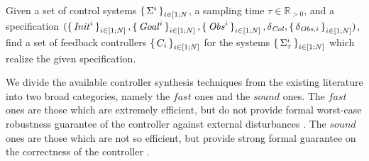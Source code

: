 \begin{comment}
 \item for \emph{every} $k\leq K$ and every $1\leq i\le N$ we have $D(x^i_k,obs)>\delta_{\obs}$.
 
 \end{itemize}
 For a given control system $\Sigma$, the targetted problem is denoted by a tuple $(x_0, \reach,\obs, \delta_{\obs},\delta_{\col})$. In linear temporal logic (LTL) notation \cite{baier2008principles}, the above conditions can be succinctly written as:
\begin{equation}\label{eq:spec}
	x_0 \wedge ([\bigwedge_{1\leq i\leq N}D(x^i,\obs)>\delta_{obs}\; \bigwedge_{1\leq i,j\leq N\;i\neq j}  d(x^i,x^j)>\delta_{\col}]\; \mathcal{U}\;\reach) .
\end{equation}
\end{comment}

\begin{problem}\label{prob:reach-avoid}
	Given a set of control systems $\set{\Sigma^i}_{i\in [1;N}$, a sampling time $\tau\in \mathbb{R}_{>0}$, and a specification $(\set{\mathit{Init}^i}_{i\in [1;N]}, \set{\mathit{Goal}^i}_{i\in [1;N]}, \set{\mathit{Obs}^i}_{i\in [1;N]}, \delta_{\mathit{Col}}, \set{\delta_{\mathit{Obs},i}}_{i\in [1;N]})$, find a set of feedback controllers $\set{C_i}_{i\in [1;N]}$ for the systems $\set{\Sigma_\tau^i}_{i\in [1;N]}$ which realize the given specification.
\end{problem}

 

We divide the available controller synthesis techniques from the existing literature into two broad categories, namely the $\mathit{fast}$ ones and the $\mathit{sound}$ ones.
The $\mathit{fast}$ ones are those which are extremely efficient, but do not provide formal worst-case robustness guarantee of the controller against external disturbances \cite{howell2019altro,choset2005principles}.
The $\mathit{sound}$ ones are those which are not so efficient, but provide strong formal guarantee on the correctness of the controller \cite{reissig2016feedback,fisac2015reach,tedrake2009lqr}.


